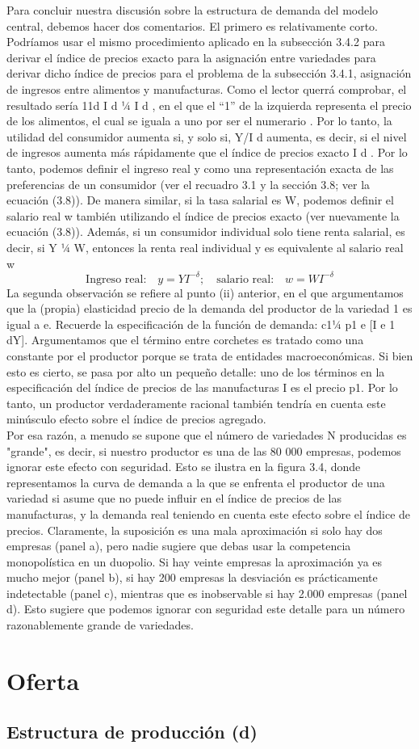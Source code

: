 Para concluir nuestra discusión sobre la estructura de demanda del modelo central, debemos hacer dos comentarios. El primero es relativamente corto. Podríamos usar el mismo procedimiento aplicado en la subsección 3.4.2 para derivar el índice de precios exacto para la asignación entre variedades para derivar dicho índice de precios para el problema de la subsección 3.4.1, asignación de ingresos entre alimentos y manufacturas. Como el lector querrá comprobar, el resultado sería 11d I d ¼ I d , en el que el “1” de la izquierda representa el precio de los alimentos, el cual se iguala a uno por ser el numerario . Por lo tanto, la utilidad del consumidor aumenta si, y solo si, Y/I d aumenta, es decir, si el nivel de ingresos aumenta más rápidamente que el índice de precios exacto I d . Por lo tanto, podemos definir el ingreso real y como una representación exacta de las preferencias de un consumidor (ver el recuadro 3.1 y la sección 3.8; ver la ecuación (3.8)). De manera similar, si la tasa salarial es W, podemos definir el salario real w también utilizando el índice de precios exacto (ver nuevamente la ecuación (3.8)). Además, si un consumidor individual solo tiene renta salarial, es decir, si Y ¼ W, entonces la renta real individual y es equivalente al salario real w\\
$$\mbox{Ingreso real:}\quad y=YI^{-\delta}; \quad \mbox{salario real:}\quad w=WI^{-\delta}$$
La segunda observación se refiere al punto (ii) anterior, en el que argumentamos que la (propia) elasticidad precio de la demanda del productor de la variedad 1 es igual a e. Recuerde la especificación de la función de demanda: c1¼ p1 e [I e 1 dY]. Argumentamos que el término entre corchetes es tratado como una constante por el productor porque se trata de entidades macroeconómicas. Si bien esto es cierto, se pasa por alto un pequeño detalle: uno de los términos en la especificación del índice de precios de las manufacturas I es el precio p1. Por lo tanto, un productor verdaderamente racional también tendría en cuenta este minúsculo efecto sobre el índice de precios agregado.\\
Por esa razón, a menudo se supone que el número de variedades N producidas es "grande", es decir, si nuestro productor es una de las 80 000 empresas, podemos ignorar este efecto con seguridad. Esto se ilustra en la figura 3.4, donde representamos la curva de demanda a la que se enfrenta el productor de una variedad si asume que no puede influir en el índice de precios de las manufacturas, y la demanda real teniendo en cuenta este efecto sobre el índice de precios. Claramente, la suposición es una mala aproximación si solo hay dos empresas (panel a), pero nadie sugiere que debas usar la competencia monopolística en un duopolio. Si hay veinte empresas la aproximación ya es mucho mejor (panel b), si hay 200 empresas la desviación es prácticamente indetectable (panel c), mientras que es inobservable si hay 2.000 empresas (panel d). Esto sugiere que podemos ignorar con seguridad este detalle para un número razonablemente grande de variedades.

\section{Oferta}
\subsection{Estructura de producción (d)}

